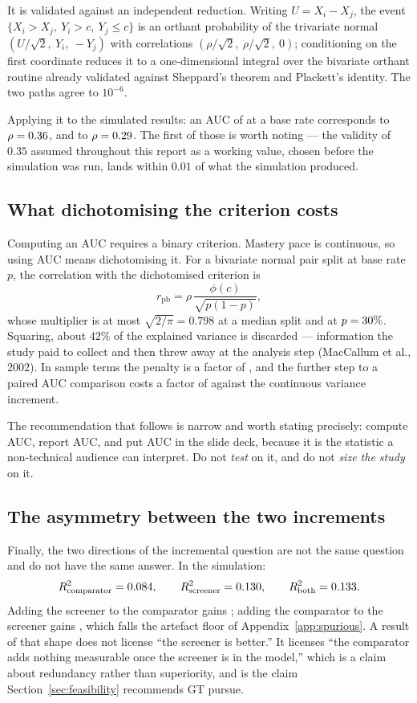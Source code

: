It is validated against an independent reduction. Writing $U = X_i - X_j$, the
event $\{X_i > X_j,\ Y_i > c,\ Y_j \le c\}$ is an orthant probability of the
trivariate normal $(U/\sqrt2,\ Y_i,\ -Y_j)$ with correlations
$(\rho/\sqrt2,\ \rho/\sqrt2,\ 0)$; conditioning on the first coordinate reduces
it to a one-dimensional integral over the bivariate orthant routine already
validated against Sheppard's theorem and Plackett's identity. The two paths
agree to $10^{-6}$.

Applying it to the simulated results: an AUC of \AUCinstr{} at a \PoolBaseRate{}
base rate corresponds to $\rho = 0.36$, and \AUCcomp{} to
$\rho = 0.29$. The first of those is worth noting --- the validity of
$0.35$ assumed throughout this report as a working value, chosen before the
simulation was run, lands within $0.01$ of what the simulation produced.

\subsection*{What dichotomising the criterion costs}

Computing an AUC requires a binary criterion. Mastery pace is continuous, so
using AUC means dichotomising it. For a bivariate normal pair split at base
rate $p$, the correlation with the dichotomised criterion is
\[
  r_{\mathrm{pb}} = \rho\,\frac{\phi(c)}{\sqrt{p(1-p)}},
\]
whose multiplier is at most $\sqrt{2/\pi} = 0.798$ at a median split and
\DichFactor{} at $p = 30\%{}$. Squaring, about $42\%$ of the explained
variance is discarded --- information the study paid to collect and then threw
away at the analysis step (MacCallum et al., 2002). In sample terms the penalty
is a factor of \DichPenalty{}, and the further step to a paired AUC comparison
costs a factor of \AUCpenalty{} against the continuous variance increment.

The recommendation that follows is narrow and worth stating precisely: compute
AUC, report AUC, and put AUC in the slide deck, because it is the statistic a
non-technical audience can interpret. Do not \emph{test} on it, and do not
\emph{size the study} on it.

\subsection*{The asymmetry between the two increments}

Finally, the two directions of the incremental question are not the same
question and do not have the same answer. In the simulation:
\[
  R^2_{\text{comparator}} = 0.084, \qquad
  R^2_{\text{screener}} = 0.130, \qquad
  R^2_{\text{both}} = 0.133.
\]
Adding the screener to the comparator gains \DeltaAddInstr{}; adding the
comparator to the screener gains \DeltaAddComp{}, which falls
\DeltaAddCompVsFloor{} the artefact floor of Appendix~\ref{app:spurious}. A
result of that shape does not license ``the screener is better.'' It licenses
``the comparator adds nothing measurable once the screener is in the model,''
which is a claim about redundancy rather than superiority, and is the claim
Section~\ref{sec:feasibility} recommends GT pursue.

